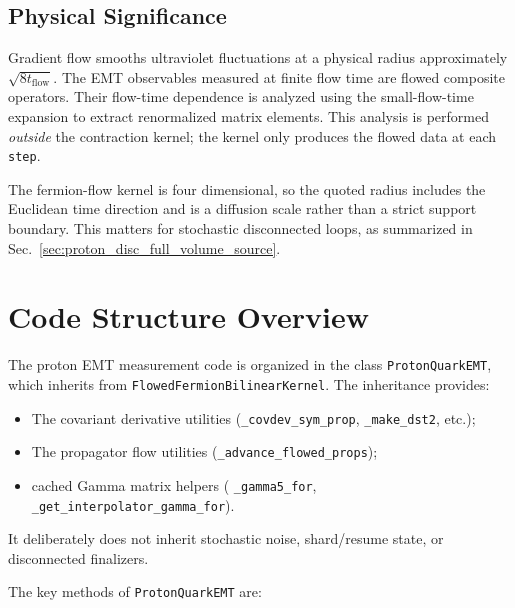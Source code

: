 \documentclass[11pt,a4paper]{article}
\begin{document}
\subsection{Physical Significance}

Gradient flow smooths ultraviolet fluctuations at a physical radius approximately
$\sqrt{8t_{\text{flow}}}$.  The EMT observables measured at finite flow time are
flowed composite operators.  Their flow-time dependence is analyzed using the
small-flow-time expansion to extract renormalized matrix elements.  This analysis
is performed \emph{outside} the contraction kernel; the kernel only produces the
flowed data at each \texttt{step}.

The fermion-flow kernel is four dimensional, so the quoted radius includes the
Euclidean time direction and is a diffusion scale rather than a strict support
boundary.  This matters for stochastic disconnected loops, as summarized in
Sec.~\ref{sec:proton_disc_full_volume_source}.

\section{Code Structure Overview}

The proton EMT measurement code is organized in the class
\texttt{ProtonQuarkEMT}, which inherits from
\texttt{FlowedFermionBilinearKernel}. The inheritance provides:
\begin{itemize}
  \item The covariant derivative utilities
        (\texttt{\_covdev\_sym\_prop}, \texttt{\_make\_dst2}, etc.);
  \item The propagator flow utilities (\texttt{\_advance\_flowed\_props});
  \item cached Gamma matrix helpers (
        \texttt{\_gamma5\_for}, \texttt{\_get\_interpolator\_gamma\_for}).
\end{itemize}
It deliberately does not inherit stochastic noise, shard/resume state, or
disconnected finalizers.

The key methods of \texttt{ProtonQuarkEMT} are:
\end{document}

